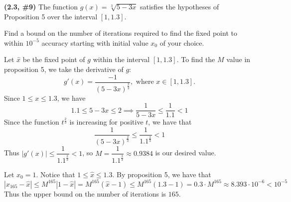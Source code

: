\documentclass{eh-homework}
\begin{document}
    \newpage
    \begin{question}{2}
    \textbf{(2.3, \#9)} The function \(g(x) = \sqrt[3]{5 - 3x}\) satisfies the hypotheses of Proposition 5 over the interval \([1, 1.3]\).
    
    Find a bound on the number of iterations required to find the fixed point to within \(10^{-5}\) accuracy starting with initial value \(x_0\) of your choice.

    Let \(\hat{x}\) be the fixed point of \(g\) within the interval \([1, 1.3]\). To find the \(M\) value in proposition 5, we take the derivative of \(g\):
    \[
        g'(x) = \frac{-1}{(5-3x)^{\frac{2}{3}}}, \text{ where } x \in [1,1.3].
    \]
    Since \(1 \leq x \leq 1.3\), we have
    \[
        1.1 \leq 5 - 3x \leq 2 \implies \frac{1}{5-3x} \leq \frac{1}{1.1} < 1
    \]
    Since the function \(t^{\frac{2}{3}}\) is increasing for positive \(t\), we have that
    \[
        \frac{1}{(5-3x)^{\frac{2}{3}}} \leq \frac{1}{1.1^{\frac{2}{3}}} < 1
    \]
    Thus \(|g'(x)| \leq \dfrac{1}{1.1^{\frac{2}{3}}} < 1\), so \(M = \dfrac{1}{1.1^{\frac{2}{3}}} \approx 0.9384\) is our desired value.

    Let \(x_0 = 1\). Notice that \(1 \leq \hat{x} \leq 1.3\). By proposition 5, we have that
    \[
        |x_{165} - \hat{x}| \leq M^{165} |1 - \hat{x}| = M^{165} (\hat{x} - 1) \leq M^{165} (1.3 - 1) = 0.3 \cdot M^{165} \approx 8.393 \cdot 10^{-6} < 10^{-5}
    \]
    Thus the upper bound on the number of iterations is \(165\).

    \end{question}
    \newpage
\end{document}
